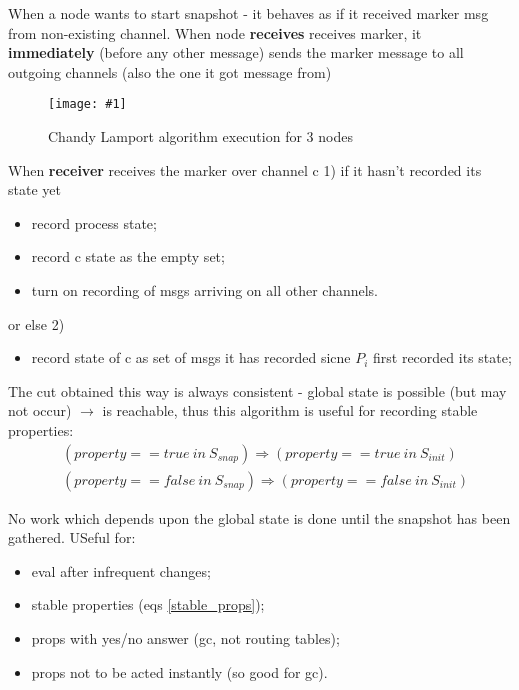 \documentclass[10pt,a4paper]{article}
\newcommand{\insImg}[2] { %
	\begin{figure}[ht!] %
		\centering %
		\texttt{[image: \#1]} %
		\caption{#2} %
		\label{overflow} %
	\end{figure} %
}
\begin{document}
When a node wants to start snapshot - it behaves as if it received marker msg from non-existing channel.
When node \textbf{receives} receives marker, it \textbf{immediately} (before any other message) sends the marker message to all outgoing channels (also the one it got message from)
\iffalse
website: https://www.websequencediagrams.com/#
P0->P0: marker(null)
Note over P0: Record state\nStart rec rx on {c01, c02}
P0->P1: marker(c01)
Note over P1: Record state\nstate[c01]={};\nStart rec rx on {c12}
P0->P2: marker(c02)
Note over P2: Record state\nstate[c02]={};\nStart rec rx on {c12}
P1->P0: marker(c01)
Note over P0: Save rec'd c01 state
P1->P2: marker(c12)
Note over P2: Save rec'd c12 state
P2->P0: marker(c02)
Note over P0: Save rec'd c02 state
P2->P1: marker(c12)
Note over P1: Save rec'd c12 state
\fi

\insImg{chandy_lamport_1}{Chandy Lamport algorithm execution for 3 nodes}
When \textbf{receiver} receives the marker over channel c 1) if it hasn't recorded its state yet
\begin{itemize}
	\item record process state;
	\item record c state as the empty set;
	\item turn on recording of msgs arriving on all other channels.
\end{itemize}
or else 2) 
\begin{itemize}
	\item record state of c as set of msgs it has recorded sicne $P_i$ first recorded its state;
\end{itemize}

The cut obtained this way is always consistent - global state is possible (but may not occur) $\rightarrow$ is reachable, thus this algorithm is useful for recording stable properties:
\begin{align}\label{stable_props}
	&(property == true \ in \ S_{snap}) \Rightarrow (property == true \ in \ S_{init})\\
	&(property == false \ in \ S_{snap}) \Rightarrow (property == false \ in \ S_{init})
\end{align}

No work which depends upon the global state is done until the snapshot has been gathered. USeful for:
\begin{itemize}
	\item eval after infrequent changes;
	\item stable properties (eqs \ref{stable_props});
	\item props with yes/no answer (gc, not routing tables);
	\item props not to be acted instantly (so good for gc).
\end{itemize}
\end{document}
